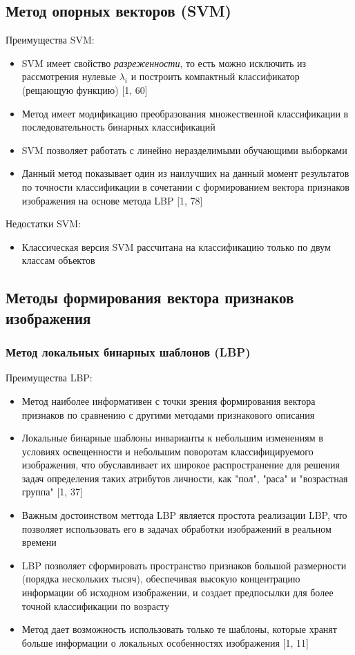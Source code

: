 \documentclass[12pt,a4paper]{article}
\begin{document}
\subsection{Метод опорных векторов (SVM)}
Преимущества SVM:
\begin{itemize}
    \item SVM имеет свойство \textit{разреженности}, то есть можно исключить из рассмотрения нулевые $\lambda_i$ и построить компактный классификатор (рещающую функцию) [1, 60]
    \item Метод имеет модификацию преобразования множественной классификации в последовательность бинарных классификаций
    \item SVM позволяет работать с линейно неразделимыми обучающими выборками
    \item Данный метод показывает один из наилучших на данный момент результатов по точности классификации в сочетании с формированием вектора признаков изображения на основе метода LBP [1, 78]
\end{itemize}

Недостатки SVM:
\begin{itemize}
    \item Классическая версия SVM рассчитана на классификацию только по двум классам объектов
\end{itemize}

\subsection{Методы формирования вектора признаков изображения}
\subsubsection{Метод локальных бинарных шаблонов (LBP)}
Преимущества LBP:
\begin{itemize}
    \item Метод наиболее информативен с точки зрения формирования вектора признаков по сравнению с другими методами признакового описания
    \item Локальные бинарные шаблоны инварианты к небольшим изменениям в условиях освещенности и небольшим поворотам классифицируемого изображения, что обуславливает их широкое распространение для решения задач определения таких атрибутов личности, как "пол", "раса" и "возрастная группа" [1, 37]
    \item Важным достоинством меттода LBP является простота реализации LBP, что позволяет использовать его в задачах обработки изображений в реальном времени
    \item LBP позволяет сформировать пространство признаков большой размерности (порядка нескольких тысяч), обеспечивая высокую концентрацию информации об исходном изображении, и создает предпосылки для более точной классификации по возрасту
    \item Метод дает возможность использовать только те шаблоны, которые хранят больше информации о локальных особенностях изображения [1, 11]
\end{itemize}
\end{document}
